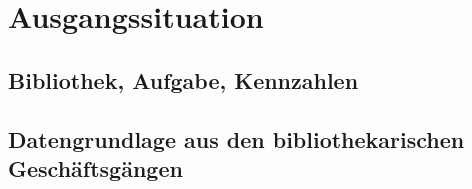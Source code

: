 \chapter{Ausgangssituation}

\section{Bibliothek, Aufgabe, Kennzahlen}
\section{Datengrundlage aus den bibliothekarischen Geschäftsgängen}
